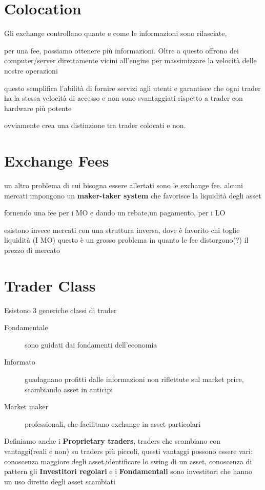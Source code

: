 \documentclass[a4paper,11pt]{report}
\begin{document}
{\newpage

\section{Colocation}
	Gli exchange controllano quante e come le informazioni sono rilasciate,

	per una fee, possiamo ottenere più informazioni. \newline
	Oltre a questo offrono dei computer/server direttamente vicini all'engine per massimizzare la velocità delle nostre operazioni

	questo semplifica l'abilità di fornire servizi agli utenti e garantisce che ogni trader ha la stessa velocità di accesso e non sono svantaggiati rispetto a trader con hardware più potente

	ovviamente crea una distinzione tra trader colocati e non.
\section{Exchange Fees}
	un altro problema di cui bisogna essere allertati sono le exchange fee. \newline
	alcuni mercati impongono un \textbf{maker-taker system} che favorisce la liquidità degli asset

	fornendo una fee per i MO e dando un rebate,un pagamento, per i LO

	esistono invece mercati con una struttura inversa, dove è favorito chi toglie liquidità (I MO) \newline
	 questo è un grosso problema in quanto le fee distorgono(?) il prezzo di mercato
\section{Trader Class}
	Esistono 3 generiche classi di trader
\begin{description}
	\item[Fondamentale] sono guidati dai fondamenti dell'economia
	\item[Informato] guadagnano profitti dalle informazioni non riflettute sul market price, scambiando asset in anticipi
	\item[Market maker] professionali, che facilitano exchange in asset particolari
\end{description}
	Definiamo anche i \textbf{Proprietary traders}, traders che scambiano con vantaggi(reali e non) su traders più piccoli, questi 		vantaggi possono essere vari: conoscenza maggiore degli asset,identificare lo swing di un asset, conoscenza di pattern \newline
	gli \textbf{Investitori regolari} e i \textbf{Fondamentali} sono investitori che hanno un uso diretto degli asset scambiati

}
\end{document}
